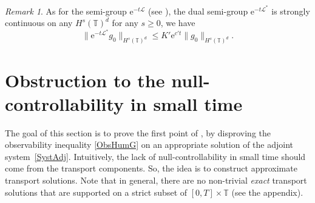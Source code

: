 \documentclass[10pt]{amsart}
\let\mathcal\mathscr
\theoremstyle{plain}
\theoremstyle{definition}
\theoremstyle{remark}
\newtheorem{remark}[theorem]{Remark}
\newcommand{\set}{\mathbb}
\newcommand{\T}{\set{T}}
\newcommand{\eu}{\mathrm e}
\begin{document}
\begin{remark}\label{rk:semigroup*_Hs}
As for the semi-group $\eu^{-t\mathcal L}$ (see ), the dual semi-group $\eu^{-t\mathcal L^*}$ is strongly continuous on any $H^s(\T)^d$ for any $s\geq 0$, \ie we have
\[
\|\eu^{-t\mathcal L^*} g_0\|_{H^s(\T)^d} \leq K'\eu^{c' t}\|g_0\|_{H^s(\T)^d}.
\]
\end{remark}

\section{Obstruction to the null-controllability in small time} \label{Sec:Obst}

The goal of this section is to prove the first point of , by disproving the observability inequality \eqref{ObsHumG} on an appropriate solution of the adjoint system~\eqref{SystAdj}. Intuitively, the lack of null-controllability in small time should come from the transport components. So, the idea is to construct approximate transport solutions. Note that in general, there are no non-trivial \emph{exact} transport solutions that are supported on a strict subset of $[0,T]\times \set T$ (see the appendix).
\end{document}
